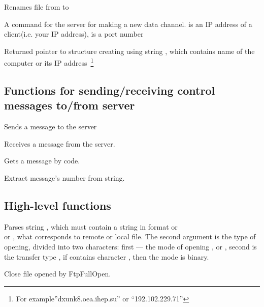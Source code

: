 

{Renames file from  to }

{ A command for the server for making a new data channel.  is an IP address of a client(i.e. your IP address), 
 is a port number}


{Returned pointer to structure  creating using string 
, which contains name of the computer or its IP 
address~\footnote{For example''dxunk8.oea.ihep.su'' or ``192.102.229.71''} 
}  


\subsection{Functions for sending/receiving control messages to/from server}

{Sends a message to the server}

{Receives a message from the server.}

{Gets a message by code.}

{Extract message's number from string.}

\subsection{High-level functions}

{  
Parses string , which must contain a string in format or \\
 or ,
what corresponds to remote or local file. The second argument is the type of opening, divided into two characters: 
first --- the mode of opening ,  or , second is the transfer type , if contains character ,
 then the mode is binary.
}

{  
Close file opened by FtpFullOpen.
}

